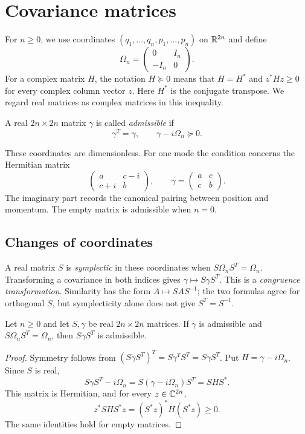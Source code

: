 \section{Covariance matrices}
\label{sec:covariance}
For $n\geq0$, we use coordinates
$(q_1,\ldots,q_n,p_1,\ldots,p_n)$ on $\mathbb R^{2n}$ and define
\[
 \Omega_n=\begin{pmatrix}0&I_n\\-I_n&0\end{pmatrix}.
\]
For a complex matrix $H$, the notation $H\succeq0$ means that $H=H^*$ and
$z^*Hz\geq0$ for every complex column vector $z$. Here $H^*$ is the conjugate
transpose. We regard real matrices as complex matrices in this inequality.

\begin{definition}\label{def:admissible}
A real $2n\times2n$ matrix $\gamma$ is called \emph{admissible} if
\begin{equation}\label{eq:admissibility}
 \gamma^T=\gamma,\qquad \gamma-i\Omega_n\succeq0.
\end{equation}
\end{definition}
These coordinates are dimensionless.  For one mode the condition concerns the
Hermitian matrix
\[
 \begin{pmatrix}a&c-i\\c+i&b\end{pmatrix},
 \qquad \gamma=\begin{pmatrix}a&c\\c&b\end{pmatrix}.
\]
The imaginary part records the canonical pairing between position and momentum.
The empty matrix is admissible when $n=0$.

\subsection{Changes of coordinates}
A real matrix $S$ is \emph{symplectic} in these coordinates when
$S\Omega_nS^T=\Omega_n$. Transforming a covariance in both indices gives
$\gamma\mapsto S\gamma S^T$. This is a \emph{congruence transformation}. Similarity
has the form $A\mapsto SAS^{-1}$; the two formulas agree for orthogonal $S$,
but symplecticity alone does not give $S^T=S^{-1}$.

\begin{theorem}\label{thm:congruence}
Let $n\geq0$ and let $S,\gamma$ be real $2n\times2n$ matrices. If $\gamma$
is admissible and $S\Omega_nS^T=\Omega_n$, then $S\gamma S^T$ is admissible.
\end{theorem}
\begin{proof}
Symmetry follows from $(S\gamma S^T)^T=S\gamma^TS^T=S\gamma S^T$.
Put $H=\gamma-i\Omega_n$. Since $S$ is real,
\[
 S\gamma S^T-i\Omega_n=S(\gamma-i\Omega_n)S^T=SHS^*.
\]
This matrix is Hermitian, and for every $z\in\mathbb C^{2n}$,
\[
 z^*SHS^*z=(S^*z)^*H(S^*z)\geq0.
\]
The same identities hold for empty matrices.
\end{proof}

